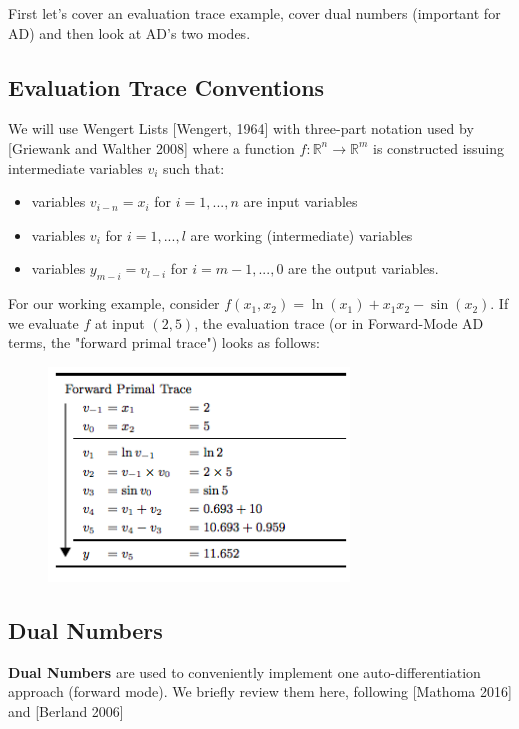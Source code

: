 \documentclass[11pt]{article}
\theoremstyle{definition}
\theoremstyle{plain}
\renewcommand{\b}[1]{\mathbb{#1}}
\begin{document}
\noindent First let's cover an evaluation trace example, cover dual numbers (important for AD) 
and then look at AD's two modes.

\newpage

\subsection{Evaluation Trace Conventions}

We will use Wengert Lists [Wengert, 1964] with three-part notation used by 
[Griewank and Walther 2008] where a function $f: \b{R}^n \rightarrow \b{R}^m$ 
is constructed issuing intermediate variables $v_i$ such that:

\begin{itemize}
    \item variables $v_{i-n} = x_i$ for $i=1,...,n$ are input variables
    \item variables $v_i$ for $i=1,...,l$ are working (intermediate) variables
    \item variables $y_{m-i} = v_{l-i}$ for $i=m-1,...,0$ are the output variables.
\end{itemize}

\noindent For our working example, consider $f(x_1,x_2) = \ln(x_1) + x_1x_2 - \sin(x_2)$. 
If we evaluate $f$ at input $(2,5)$, the evaluation trace (or in Forward-Mode AD terms,
the "forward primal trace") looks as follows:

\begin{figure}[H]
\includegraphics[width=8cm]{forward}
\centering
\end{figure}

\newpage

\subsection{Dual Numbers}

\noindent \textbf{Dual Numbers} are used to conveniently implement
one auto-differentiation approach (forward mode). We briefly review them
here, following [Mathoma 2016] and [Berland 2006]\\
\end{document}
